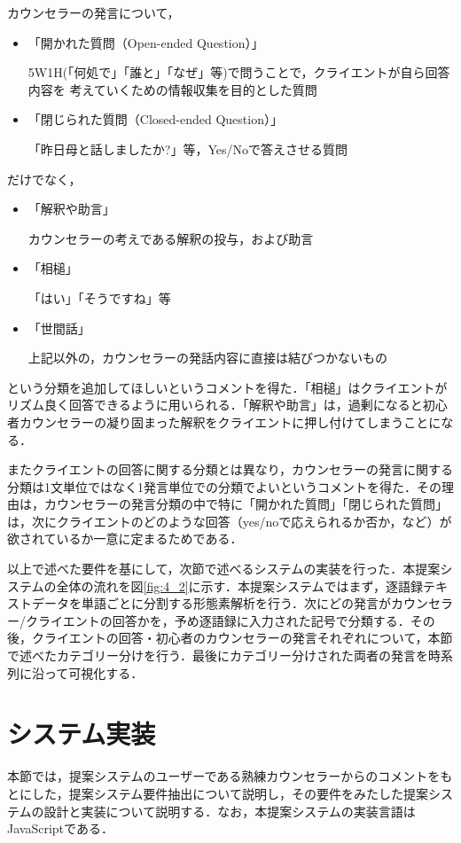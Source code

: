 \documentclass[shuuron]{kuee}
\begin{document}
カウンセラーの発言について，
\begin{itemize}
  \item 「開かれた質問（Open-ended Question）」

  5W1H(「何処で」「誰と」「なぜ」等)で問うことで，クライエントが自ら回答内容を
  考えていくための情報収集を目的とした質問
  \item 「閉じられた質問（Closed-ended Question）」

  「昨日母と話しましたか?」等，Yes/Noで答えさせる質問
\end{itemize}
だけでなく，
\begin{itemize}
  \item 「解釈や助言」

  カウンセラーの考えである解釈の投与，および助言
  \item 「相槌」

  「はい」「そうですね」等
  \item 「世間話」

  上記以外の，カウンセラーの発話内容に直接は結びつかないもの
\end{itemize}
という分類を追加してほしいというコメントを得た．「相槌」はクライエントがリズム良く回答できるように用いられる．「解釈や助言」は，過剰になると初心者カウンセラーの凝り固まった解釈をクライエントに押し付けてしまうことになる．

またクライエントの回答に関する分類とは異なり，カウンセラーの発言に関する分類は1文単位ではなく1発言単位での分類でよいというコメントを得た．その理由は，カウンセラーの発言分類の中で特に「開かれた質問」「閉じられた質問」は，次にクライエントのどのような回答（yes/noで応えられるか否か，など）が欲されているか一意に定まるためである．

以上で述べた要件を基にして，次節で述べるシステムの実装を行った．本提案システムの全体の流れを図\ref{fig:4_2}に示す．本提案システムではまず，逐語録テキストデータを単語ごとに分割する形態素解析を行う．次にどの発言がカウンセラー/クライエントの回答かを，予め逐語録に入力された記号で分類する．その後，クライエントの回答・初心者のカウンセラーの発言それぞれについて，本節で述べたカテゴリー分けを行う．最後にカテゴリー分けされた両者の発言を時系列に沿って可視化する．

\section{システム実装}

本節では，提案システムのユーザーである熟練カウンセラーからのコメントをもとにした，提案システム要件抽出について説明し，その要件をみたした提案システムの設計と実装について説明する．なお，本提案システムの実装言語はJavaScriptである．
\end{document}
